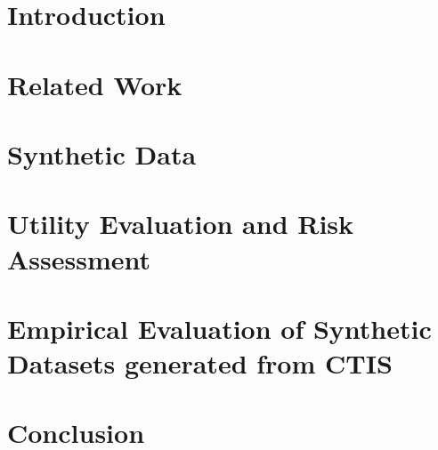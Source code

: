 \documentclass[12pt]{article}
\begin{document}
\newpage


    
\section{Introduction}
\label{chapter1:intro}

\newpage

\section{Related Work}
\label{chapter2:relatedwork}

\newpage

\section{Synthetic Data}
\label{chapter3:syn}

\newpage

\section{Utility Evaluation and Risk Assessment}
\label{chapter4:eva}

\newpage

\section{Empirical Evaluation of Synthetic Datasets generated from CTIS}
\label{chapter5:ctis}

\newpage

% 

\section{Conclusion}
\label{chapter6:conclusion}


\newpage

    
\end{document}

